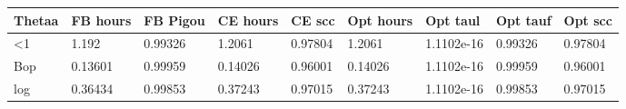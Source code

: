\begin{tabular}{lllllllll}
Thetaa & FB hours & FB Pigou & CE hours & CE scc & Opt hours & Opt taul & Opt tauf & Opt scc \\ 
\hline 
<1 & 1.192 & 0.99326 & 1.2061 & 0.97804 & 1.2061 & 1.1102e-16 & 0.99326 & 0.97804 \\ 
Bop & 0.13601 & 0.99959 & 0.14026 & 0.96001 & 0.14026 & 1.1102e-16 & 0.99959 & 0.96001 \\ 
log & 0.36434 & 0.99853 & 0.37243 & 0.97015 & 0.37243 & 1.1102e-16 & 0.99853 & 0.97015 \\ 
\hline 
\end{tabular}
